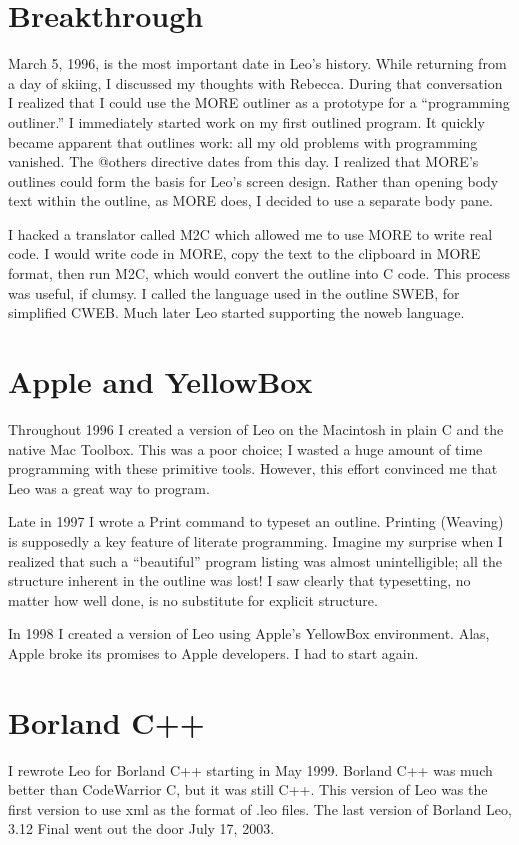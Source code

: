 \documentclass[a4paper,10pt,english]{sphinxmanual}
\begin{document}
\section{Breakthrough}
\label{history:breakthrough}
March 5, 1996, is the most important date in Leo's history. While returning from
a day of skiing, I discussed my thoughts with Rebecca. During that conversation
I realized that I could use the MORE outliner as a prototype for a ``programming
outliner.'' I immediately started work on my first outlined program. It quickly
became apparent that outlines work: all my old problems with programming
vanished. The @others directive dates from this day. I realized that MORE's
outlines could form the basis for Leo's screen design. Rather than opening body
text within the outline, as MORE does, I decided to use a separate body pane.

I hacked a translator called M2C which allowed me to use MORE to write
real code. I would write code in MORE, copy the text to the clipboard in
MORE format, then run M2C, which would convert the outline into C code.
This process was useful, if clumsy. I called the language used in the outline
SWEB, for simplified CWEB. Much later Leo started supporting the noweb
language.


\section{Apple and YellowBox}
\label{history:apple-and-yellowbox}
Throughout 1996 I created a version of Leo on the Macintosh in plain C and the
native Mac Toolbox. This was a poor choice; I wasted a huge amount of time
programming with these primitive tools. However, this effort convinced me that
Leo was a great way to program.

Late in 1997 I wrote a Print command to typeset an outline. Printing (Weaving)
is supposedly a key feature of literate programming. Imagine my surprise when I
realized that such a ``beautiful'' program listing was almost unintelligible; all
the structure inherent in the outline was lost! I saw clearly that typesetting,
no matter how well done, is no substitute for explicit structure.

In 1998 I created a version of Leo using Apple's YellowBox environment. Alas,
Apple broke its promises to Apple developers. I had to start again.


\section{Borland C++}
\label{history:borland-c}
I rewrote Leo for Borland C++ starting in May 1999. Borland C++ was much better
than CodeWarrior C, but it was still C++. This version of Leo was the first
version to use xml as the format of .leo files. The last version of Borland Leo,
3.12 Final went out the door July 17, 2003.
\end{document}
